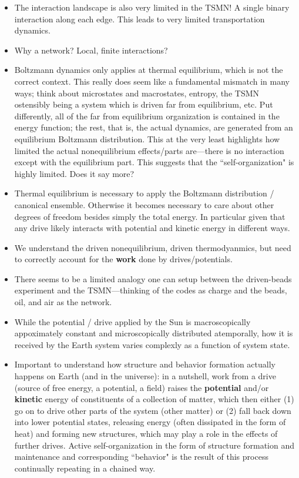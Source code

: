 \documentclass[12pt,letterpaper]{article}
\begin{document}
\begin{itemize}
\item The interaction landscape is also very limited in the TSMN! A single binary interaction along each edge. This leads to very limited transportation dynamics.
\item Why a network? Local, finite interactions?
\item Boltzmann dynamics only applies at thermal equilibrium, which is not the correct context. This really does seem like a fundamental mismatch in many ways; think about microstates and macrostates, entropy, the TSMN ostensibly being a system which is driven far from equilibrium, etc. Put differently, all of the far from equilibrium organization is contained in the energy function; the rest, that is, the actual dynamics, are generated from an equilibrium Boltzmann distribution. This at the very least highlights how limited the actual nonequilibrium effects/parts are---there is no interaction except with the equilibrium part. This suggests that the ``self-organization" is highly limited. Does it say more?
\item Thermal equilibrium is necessary to apply the Boltzmann distribution / canonical ensemble. Otherwise it becomes necessary to care about other degrees of freedom besides simply the total energy. In particular given that any drive likely interacts with potential and kinetic energy in different ways.
\item We understand the driven nonequilibrium, driven thermodyanmics, but need to correctly account for the \textbf{work} done by drives/potentials.
\item There seems to be a limited analogy one can setup between the driven-beads experiment and the TSMN---thinking of the codes as charge and the beads, oil, and air as the network.
\item While the potential / drive applied by the Sun is macroscopically appoximately constant and microscopically distributed atemporally, how it is received by the Earth system varies complexly as a function of system state.
\item Important to understand how structure and behavior formation actually happens on Earth (and in the universe): in a nutshell, work from a drive (source of free energy, a potential, a field) raises the \textbf{potential} and/or \textbf{kinetic} energy of constituents of a collection of matter, which then either (1) go on to drive other parts of the system (other matter) or (2) fall back down into lower potential states, releasing energy (often dissipated in the form of heat) and forming new structures, which may play a role in the effects of further drives. Active self-organization in the form of structure formation and maintenance and corresponding ``behavior" is the result of this process continually repeating in a chained way.

\end{itemize}
\end{document}
